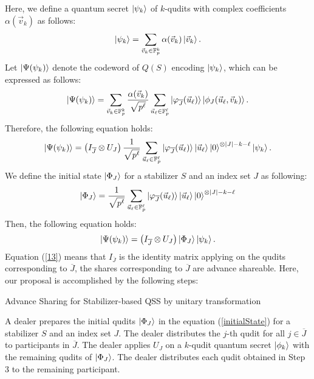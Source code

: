 \documentclass[11pt,a4paper]{article}
\theoremstyle{definition}
\begin{document}
Here, we define a quantum secret $\ket{\psi_k}$ of $k$-qudits with complex coefficients $\alpha(\vec{v}_k)$ as follows:
\begin{equation}
    \ket{\psi_k} = \sum_{\vec{v}_k\in\mathbb{F}_p^k}\alpha(\vec{v}_k)\ket{\vec{v}_k}.
\end{equation}
Let \(\ket{\Psi(\psi_k)}\) denote the codeword of \(Q(S)\) encoding \(\ket{\psi_k}\), which can be expressed as follows:
\begin{equation}
    \ket{\Psi(\psi_k)} = \sum_{\vec{v}_k\in\mathbb{F}_p^k}\frac{\alpha(\vec{v}_k)}{\sqrt{p^\ell}}\sum_{\vec{u}_\ell\in\mathbb{F}_p^\ell}\ket{\varphi_{\overline{J}}(\vec{u}_\ell)}\ket{\phi_J(\vec{u}_\ell,\vec{v}_k)}.
\end{equation}
Therefore, the following equation holds:
\begin{align}
    \ket{\Psi(\psi_k)} =
    \left( I_{\overline{J}}\otimes U_J\right)\frac{1}{\sqrt{p^\ell}}\sum_{\vec{u}_\ell\in\mathbb{F}_p^\ell}\ket{\varphi_{\overline{J}}(\vec{u}_\ell)}\ket{\vec{u}_\ell}\ket{0}^{\otimes |J|-k-\ell}\ket{\psi_k}.
\end{align}
We define the initial state $\ket{\Phi_J}$ for a stabilizer $S$ and an index set $J$ as following:
\begin{equation}\label{initialState}
    \ket{\Phi_J} = \frac{1}{\sqrt{p^\ell}}\sum_{\vec{u}_\ell\in\mathbb{F}_p^\ell}\ket{\varphi_{\overline{J}}(\vec{u}_\ell)}\ket{\vec{u}_\ell}\ket{0}^{\otimes |J|-k-\ell}
\end{equation}
Then, the following equation holds:
\begin{equation}\label{13}
    \ket{\Psi(\psi_k)} = \left( I_{\overline{J}}\otimes U_J\right)\ket{\Phi_J}\ket{\psi_k}.
\end{equation}
Equation (\ref{13}) means that 
\(I_{\overline{J}}\) is the identity matrix applying on the qudits corresponding to \(\overline{J}\), the shares corresponding to \(\overline{J}\) are advance shareable.
Here, our proposal is accomplished by the following steps:
\begin{algorithm}[H]
	\caption{Advance Sharing for Stabilizer-based QSS by unitary transformation}
	\begin{algorithmic}[1]
    \STATE A dealer prepares the initial qudits $\ket{\Phi_J}$ in the equation (\ref{initialState}) for a stabilizer $S$ and an index set $J$.
    \STATE The dealer distributes the $j$-th qudit for all $j\in\overline{J}$ to participants in $\overline{J}$.
    \STATE The dealer applies $U_J$ on a $k$-qudit quantum secret $\ket{\phi_k}$ with the remaining qudits of \( \ket{\Phi_J} \).
    \STATE The dealer distributes each qudit obtained in Step 3 to the remaining participant.
    \end{algorithmic}
\end{algorithm}
\end{document}
